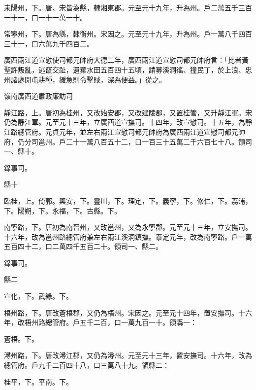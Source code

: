\begin{pinyinscope}
 耒陽州，下。唐、宋皆為縣，隸湘東郡。元至元十九年，升為州。戶二萬五千三百一十一，口一十一萬一十。



 常寧州，下。唐為縣，隸衡州。宋因之。元至元十九年，升為州。戶一萬八千四百三十一，口六萬九千四百二。



 廣西兩江道宣慰使司都元帥府大德二年，廣西兩江道宣慰司都元帥府言：「比者黃聖許叛亂，逃竄交趾，遺棄水田五百四十五頃，請募溪洞徭、獞民丁，於上浪、忠州諸處開屯耕種，緩急則令擊賊，深為便益。」從之。



 嶺南廣西道肅政廉訪司



 靜江路，上。唐初為桂州，又改始安郡，又改建陵郡，又置桂管，又升靜江軍。宋仍為靜江軍。元至元十三年，立廣西道宣撫司。十四年，改宣慰司。十五年，為靜江路總管府。元貞元年，並左右兩江宣慰司都元帥府為廣西兩江道宣慰司都元帥府，仍分司邕州。戶二十一萬八百五十二，口一百三十五萬二千六百七十八。領司一、縣十。



 錄事司。



 縣十



 臨桂，上。倚郭。興安，下。靈川，下。理定，下。義寧，下。修仁，下。荔浦，下。陽朔，下。永福，下。古縣。下。



 南寧路，下。唐初為南晉州，又改邕州，又為永寧郡。元至元十三年，立安撫司。十六年，改為邕州路總管府兼左右兩江溪洞鎮撫。泰定元年，改為南寧路。戶一萬五百四十二，口二萬四千五百二十。領司一、縣二。



 錄事司。



 縣二



 宣化，下。武緣。下。



 梧州路，下。唐改蒼梧郡，又仍為梧州。宋因之。元至元十四年，置安撫司。十六年，改梧州路總管府。戶五千二百，口一萬九百一十。領縣一：



 蒼梧。下。



 潯州路，下。唐改潯江郡，又仍為潯州。元至元十三年，置安撫司。十六年，改為總管府。戶九千二百四十八，口三萬八十九。領縣二：



 桂平，下。平南。下。




\end{pinyinscope}
